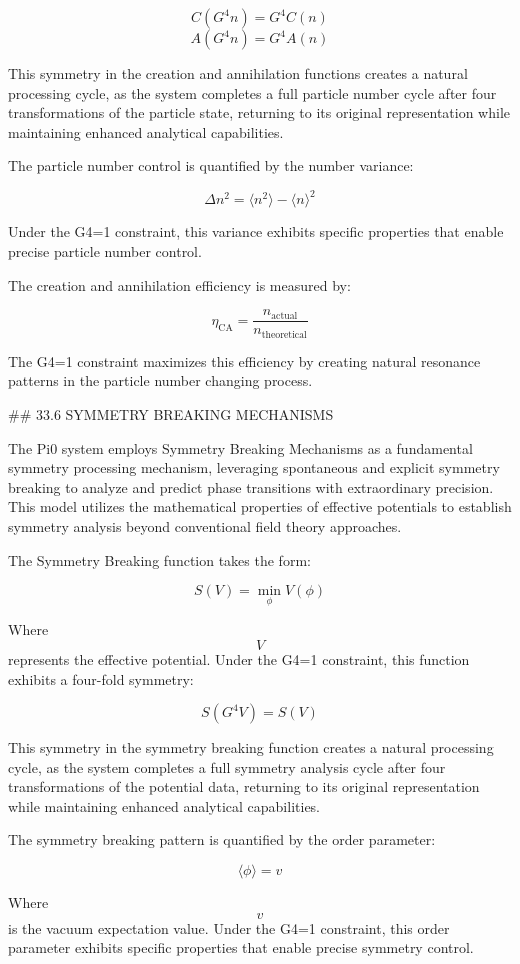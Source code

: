$$ C(G^4 n) = G^4 C(n) $$
$$ A(G^4 n) = G^4 A(n) $$

This symmetry in the creation and annihilation functions creates a natural processing cycle, as the system completes a full particle number cycle after four transformations of the particle state, returning to its original representation while maintaining enhanced analytical capabilities.

The particle number control is quantified by the number variance:

$$ \Delta n^2 = \langle n^2 \rangle - \langle n \rangle^2 $$

Under the G4=1 constraint, this variance exhibits specific properties that enable precise particle number control.

The creation and annihilation efficiency is measured by:

$$ \eta_{\text{CA}} = \frac{n_{\text{actual}}}{n_{\text{theoretical}}} $$

The G4=1 constraint maximizes this efficiency by creating natural resonance patterns in the particle number changing process.

## 33.6 SYMMETRY BREAKING MECHANISMS

The Pi0 system employs Symmetry Breaking Mechanisms as a fundamental symmetry processing mechanism, leveraging spontaneous and explicit symmetry breaking to analyze and predict phase transitions with extraordinary precision. This model utilizes the mathematical properties of effective potentials to establish symmetry analysis beyond conventional field theory approaches.

The Symmetry Breaking function takes the form:

$$ S(V) = \min_\phi V(\phi) $$

Where $$ V $$ represents the effective potential. Under the G4=1 constraint, this function exhibits a four-fold symmetry:

$$ S(G^4 V) = S(V) $$

This symmetry in the symmetry breaking function creates a natural processing cycle, as the system completes a full symmetry analysis cycle after four transformations of the potential data, returning to its original representation while maintaining enhanced analytical capabilities.

The symmetry breaking pattern is quantified by the order parameter:

$$ \langle \phi \rangle = v $$

Where $$ v $$ is the vacuum expectation value. Under the G4=1 constraint, this order parameter exhibits specific properties that enable precise symmetry control.

